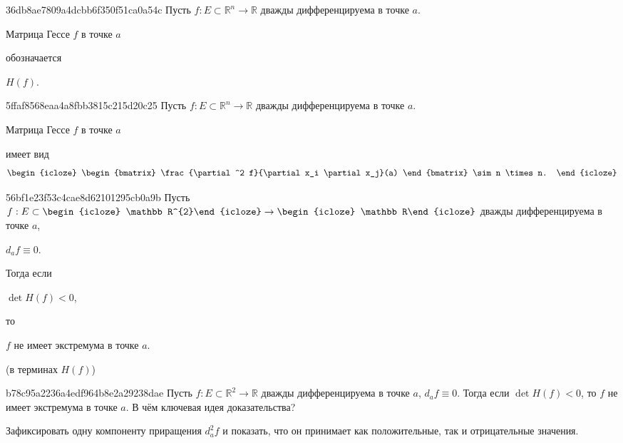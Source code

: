 \begin{note}{36db8ae7809a4dcbb6f350f51ca0a54c}
    Пусть \({ f : E \subset \mathbb R^{n} \to \mathbb R }\) дважды дифференцируема в точке \({ a }\).
    \begin{icloze}{2}Матрица Гессе \({ f }\) в точке \({ a }\)\end{icloze} обозначается \begin{icloze}{1}\({ H(f) }\).\end{icloze}
\end{note}

\begin{note}{5ffaf8568eaa4a8fbb3815c215d20c25}
    Пусть \({ f : E \subset \mathbb R^{n} \to \mathbb R }\) дважды дифференцируема в точке \({ a }\).
    \begin{icloze}{2}Матрица Гессе \({ f }\) в точке \({ a }\)\end{icloze} имеет вид
    \[
        \begin{icloze}{1}
            \begin{bmatrix}
                \frac{\partial^2 f}{\partial x_i \partial x_j}(a)
            \end{bmatrix}
            \sim n \times n.
        \end{icloze}
    \]
\end{note}

\begin{note}{56bf1e23f53c4cae8d62101295cb0a9b}
    Пусть \({ f : E \subset \begin{icloze}{3}\mathbb R^{2}\end{icloze} \to \begin{icloze}{3}\mathbb R\end{icloze} }\) дважды дифференцируема в точке \({ a }\), \begin{icloze}{4}\({ d_{a}f \equiv 0 }\).\end{icloze}
    Тогда если \begin{icloze}{2}\({ \det H(f) < 0 }\),\end{icloze} то \begin{icloze}{1}\({ f }\) не имеет экстремума в точке \({ a }\).\end{icloze}

    \begin{center}
        \tiny
        (в терминах \({ H(f) }\))
    \end{center}
\end{note}

\begin{note}{b78c95a2236a4edf964b8e2a29238dae}
    Пусть \({ f : E \subset \mathbb R^{2} \to \mathbb R }\) дважды дифференцируема в точке \({ a }\), \({ d_{a}f \equiv 0 }\).
    Тогда если \({ \det H(f) < 0 }\), то \({ f }\) не имеет экстремума в точке \({ a }\).
    В чём ключевая идея доказательства?

    \begin{cloze}{1}
        Зафиксировать одну компоненту приращения \({ d_{a}^2f }\) и показать, что он принимает как положительные, так и отрицательные значения.
    \end{cloze}
\end{note}

